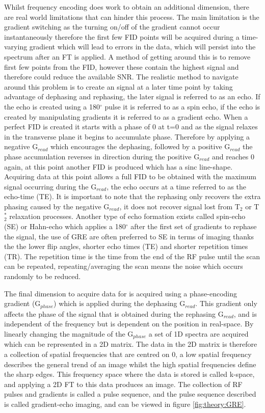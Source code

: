 \documentclass[class=article, crop=false]{standalone}
\begin{document}
Whilst frequency encoding does work to obtain an additional dimension, there are real world limitations that can hinder this process. The main limitation is the gradient switching as the turning on/off of the gradient cannot occur instantaneously therefore the first few FID points will be acquired during a time-varying gradient which will lead to errors in the data, which will persist into the spectrum after an FT is applied. A method of getting around this is to remove first few points from the FID, however these contain the highest signal and therefore could reduce the available SNR. The realistic method to navigate around this problem is to create an signal at a later time point by taking advantage of dephasing and rephasing, the later signal is referred to as an echo. If the echo is created using a 180$^\circ$ pulse it is referred to as a spin echo, if the echo is created by manipulating gradients it is referred to as a gradient echo. When a perfect FID is created it starts with a phase of 0 at t=0 and as the signal relaxes in the transverse plane it begins to accumulate phase. Therefore by applying a negative G$_{read}$ which encourages the dephasing, followed by a positive G$_{read}$ the phase accumulation reverses in direction during the positive G$_{read}$ and reaches 0 again, at this point another FID is produced which has a sinc line-shape. Acquiring data at this point allows a full FID to be obtained with the maximum signal occurring during the G$_{read}$, the echo occurs at a time referred to as the echo-time (TE). It is important to note that the rephasing only recovers the extra phasing caused by the negative G$_{read}$, it does not recover signal lost from T$_2$ or T$_2^*$ relaxation processes. Another type of echo formation exists called spin-echo (SE) or Hahn-echo\cite{Hahn1950SpinEchoes} which applies a 180$^\circ$ after the first set of gradients to rephase the signal, the use of GRE are often preferred to SE in terms of imaging thanks the the lower flip angles, shorter echo times (TE) and shorter repetition times (TR). The repetition time is the time from the end of the RF pulse until the scan can be repeated, repeating/averaging the scan means the noise which occurs randomly to be reduced.

The final dimension to acquire data for is acquired using a phase-encoding gradient (G$_{phase}$) which is applied during the dephasing G$_{read}$. This gradient only affects the phase of the signal that is obtained during the rephasing G$_{read}$, and is independent of the frequency but is dependent on the position in real-space. By linearly changing the magnitude of the G$_{phase}$ a set of 1D spectra are acquired which can be represented in a 2D matrix. The data in the 2D matrix is therefore a collection of spatial frequencies that are centred on 0, a low spatial frequency describes the general trend of an image whilst the high spatial frequencies define the sharp edges. This frequency space where the data is stored is called k-space, and applying a 2D FT to this data produces an image\cite{Lauterbur1973ImageResonance, Mansfield1977Multi-planarEchoes}. The collection of RF pulses and gradients is called a pulse sequence, and the pulse sequence described is called gradient-echo imaging, and can be viewed in figure \ref{fig:theory:GRE}.
\end{document}
